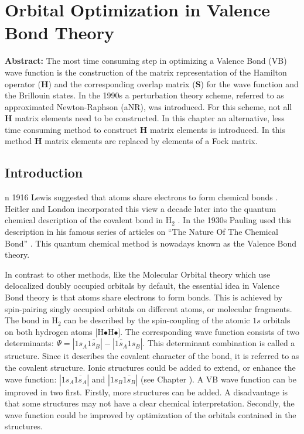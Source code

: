 \chapter{Orbital Optimization in Valence Bond Theory}
\label{chap_orbopt}


\noindent\textbf{Abstract:} The most time consuming step in optimizing a Valence Bond (VB) wave function is the construction of the matrix representation of the Hamilton operator ($\mathbf{H}$) and the corresponding overlap matrix ($\mathbf{S}$) for the wave function and the Brillouin states. In the 1990s a perturbation theory scheme, referred to as approximated Newton-Raphson (aNR), was introduced. For this scheme, not all $\mathbf{H}$ matrix elements need to be constructed. In this chapter an alternative, less time consuming method  to construct $\mathbf{H}$ matrix elements is introduced. In this method $\mathbf{H}$ matrix elements are replaced by elements of a Fock matrix.

\newpage

\section{Introduction}

\lettrine{}{}n 1916 Lewis suggested that atoms share electrons to form chemical bonds \cite{lewis}. Heitler and London incorporated this view a decade later into the quantum chemical description of the covalent bond in H$_2$ \cite{heitler}. In the 1930s Pauling used this description in his famous series of articles on ``The Nature Of The Chemical Bond'' \cite{pauling1,pauling2,pauling3,pauling4,pauling5,pauling6,pauling7,paulingbook}. This quantum chemical method is nowadays known as the Valence Bond theory.

In contrast to other methods, like the Molecular Orbital theory \cite{hartree1,hartree2,hartree3,fock} which use delocalized doubly occupied orbitals by default, the essential idea in Valence Bond theory is that atoms share electrons to form bonds. This is achieved by spin-pairing singly occupied orbitals on different atoms, or molecular fragments. The bond in H$_2$ can be described by the spin-coupling of the atomic $1s$ orbitals on both hydrogen atoms [H$\bullet$H$\bullet$]. The corresponding wave function consists of two determinants: $\Psi = |1s_{A}\overline{1s_{B}}| - |\overline{1s_{A}}1s_{B}|$. This determinant combination is called a structure. Since it describes the covalent character of the bond, it is referred to as the covalent structure. Ionic structures could be added to extend, or enhance the wave function: $|1s_{A}\overline{1s_{A}}|$ and $|1s_{B}\overline{1s_{B}}|$ (see Chapter \chintro). A VB wave function can be improved in two first. Firstly, more structures can be added. A disadvantage is that some structures may not have a clear chemical interpretation. Secondly, the wave function could be improved by optimization of the orbitals contained in the structures.

